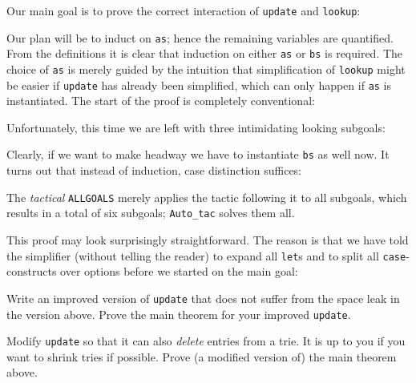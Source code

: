 Our main goal is to prove the correct interaction of \texttt{update} and
\texttt{lookup}:
\begin{quote}\small

\end{quote}
Our plan will be to induct on \texttt{as}; hence the remaining variables are
quantified. From the definitions it is clear that induction on either
\texttt{as} or \texttt{bs} is required. The choice of \texttt{as} is merely
guided by the intuition that simplification of \texttt{lookup} might be easier
if \texttt{update} has already been simplified, which can only happen if
\texttt{as} is instantiated.
The start of the proof is completely conventional:
\begin{ttbox}
\end{ttbox}
Unfortunately, this time we are left with three intimidating looking subgoals:
\begin{ttbox}
\end{ttbox}
Clearly, if we want to make headway we have to instantiate \texttt{bs} as
well now. It turns out that instead of induction, case distinction
suffices:
\begin{ttbox}
\end{ttbox}
The {\em tactical} \texttt{ALLGOALS} merely applies the tactic following it
to all subgoals, which results in a total of six subgoals; \texttt{Auto_tac}
solves them all.

This proof may look surprisingly straightforward. The reason is that we
have told the simplifier (without telling the reader) to expand all
\texttt{let}s and to split all \texttt{case}-constructs over options before
we started on the main goal:
\begin{ttbox}
\end{ttbox}

\begin{exercise}
  Write an improved version of \texttt{update} that does not suffer from the
  space leak in the version above. Prove the main theorem for your improved
  \texttt{update}.
\end{exercise}

\begin{exercise}
  Modify \texttt{update} so that it can also {\em delete} entries from a
  trie. It is up to you if you want to shrink tries if possible. Prove (a
  modified version of) the main theorem above.
\end{exercise}

